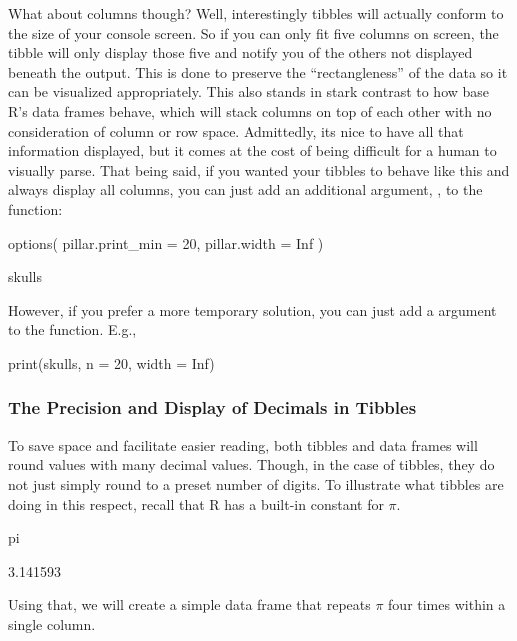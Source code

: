 What about columns though? Well, interestingly tibbles will actually conform to the size of your console screen.  So if you can only fit five columns on screen, the tibble will only display those five and notify you of the others not displayed beneath the output. This is done to preserve the ``rectangleness'' of the data so it can be visualized appropriately. This also stands in stark contrast to how base R's data frames behave, which will stack columns on top of each other with no consideration of column or row space. Admittedly, its nice to have all that information displayed, but it comes at the cost of being difficult for a human to visually parse. That being said, if you wanted your tibbles to behave like this and always display all columns, you can just add an additional argument, , to the  function:

\begin{inR}
options(
  pillar.print_min = 20,
  pillar.width = Inf
)

skulls
\end{inR}

\vspace{1em}

\noindent
However, if you prefer a more temporary solution, you can just add a  argument to the  function. E.g., 

\begin{inR}
print(skulls, n = 20, width = Inf)
\end{inR}

\vspace{1em}

\subsubsection{The Precision and Display of Decimals in Tibbles}
\label{sec:sig_digs}

To save space and facilitate easier reading, both tibbles and data frames will round values with many decimal values. Though, in the case of tibbles, they do not just simply round to a preset number of digits.  To illustrate what tibbles are doing in this respect, recall that R has a built-in constant for $\pi$.

\begin{inR}
pi
\end{inR}
\begin{outR}
[1] 3.141593
\end{outR}

\noindent
Using that, we will create a simple data frame that repeats $\pi$ four times within a single column.

